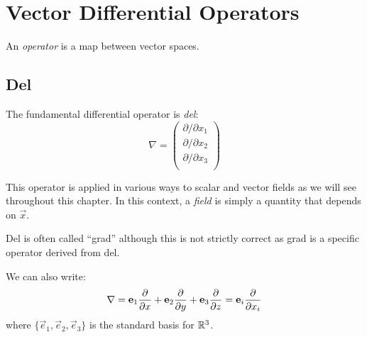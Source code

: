 \documentclass[../main.tex]{subfiles}
\begin{document}
\chapter{Vector Differential Operators}
\label{chapter1}
\begin{definition}[Operator]
  An \textit{operator} is a map between vector spaces.
\end{definition}
\section{Del}
\begin{definition}
  The fundamental differential operator is \textit{del}:
  \[
    \nabla = \begin{pmatrix}
    \partial/\partial x_1 \\
    \partial/\partial x_2 \\
    \partial/\partial x_3 \\
    \end{pmatrix}
  \]
\end{definition}
This operator is applied in various ways to scalar and vector fields as we will see throughout this chapter.
In this context, a \textit{field} is simply a quantity that depends on $\vec{x}$.
\begin{remark}
  Del is often called ``grad'' although this is not strictly correct as grad is a specific operator derived from del.
\end{remark}
We can also write:
\[
  \nabla = \vec{e}_1 \pderiv{}{x} + \vec{e}_2 \pderiv{}{y} + \vec{e}_3 \pderiv{}{z} = \vec{e}_i \pderiv{}{x_i}
\]
where $\{\vec{e}_1, \vec{e}_2, \vec{e}_3\}$ is the standard basis for $\mathbb{R}^{3}$.
\end{document}
